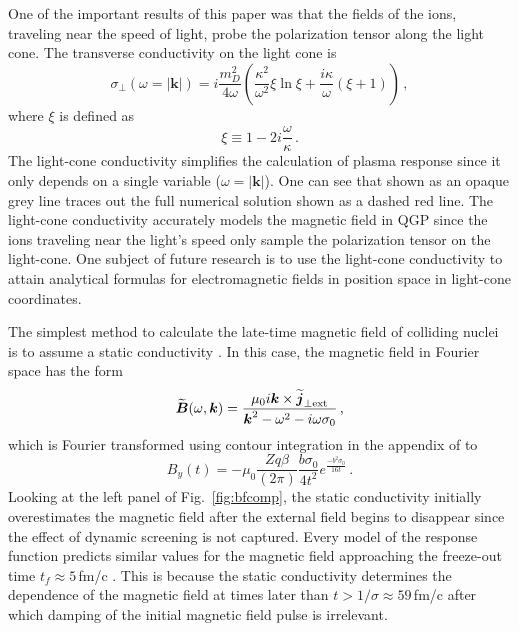 One of the important results of this paper was that the fields of the ions, traveling near the speed of light, probe the polarization tensor along the light cone. The transverse conductivity on the light cone is
\begin{equation}\label{eq:lightcone}
    \sigma_\perp (\omega = |\boldsymbol{k}|)  =  i \frac{m_D^2}{4 \omega}\left( \frac{\kappa^2}{\omega^2} \xi \ln\xi +\frac{i\kappa}{\omega}\left(\xi+1\right)\right)\,,
\end{equation}
where $\xi$ is defined as
\begin{equation}\label{eq:xidef}
    \xi \equiv 1- 2i \frac{\omega}{\kappa}\,.
\end{equation}
The light-cone conductivity simplifies the calculation of plasma response since it only depends on a single variable ($\omega = |\boldsymbol{k}|$). One can see that  shown as an opaque grey line traces out the full numerical solution  shown as a dashed red line. The light-cone conductivity accurately models the magnetic field in QGP since the ions traveling near the light's speed only sample the polarization tensor on the light-cone. One subject of future research is to use the light-cone conductivity to attain analytical formulas for electromagnetic fields in position space in light-cone coordinates.


The simplest method to calculate the late-time magnetic field of colliding nuclei is to assume a static conductivity \cite{Tuchin:2013apa}. In this case, the magnetic field in Fourier space has the form
\begin{equation}\label{eq:bstat}
    \widetilde{\boldsymbol{B}}(\omega,\boldsymbol{k}) = \frac{ \mu_0 i\boldsymbol{k} \times \widetilde{\boldsymbol{j}}_{\perp \text{ext}}}{\boldsymbol{k}^2 - \omega^2 - i\omega\sigma_0}\,,
\end{equation}
which is Fourier transformed using contour integration in the appendix of \cite{Grayson:2022asf} to
\begin{equation}\label{eq:banalyticapp}
   B_y(t) = -\mu_0 \frac{ Zq \beta }{(2\pi)} \frac{ b\sigma_0}{4t^2} e^{\frac{-b^2 \sigma_0}{16 t}}\,.
\end{equation}
Looking at the left panel of Fig.~\ref{fig:bfcomp}, the static conductivity initially overestimates the magnetic field after the external field begins to disappear since the effect of dynamic screening is not captured. Every model of the response function predicts similar values for the magnetic field approaching the freeze-out time $t_f \approx 5\,$fm/c \cite{Song:2007ux}. This is because the static conductivity determines the dependence of the magnetic field at times later than $t>1/\sigma \approx 59$\,fm/c after which damping of the initial magnetic field pulse is irrelevant. 


